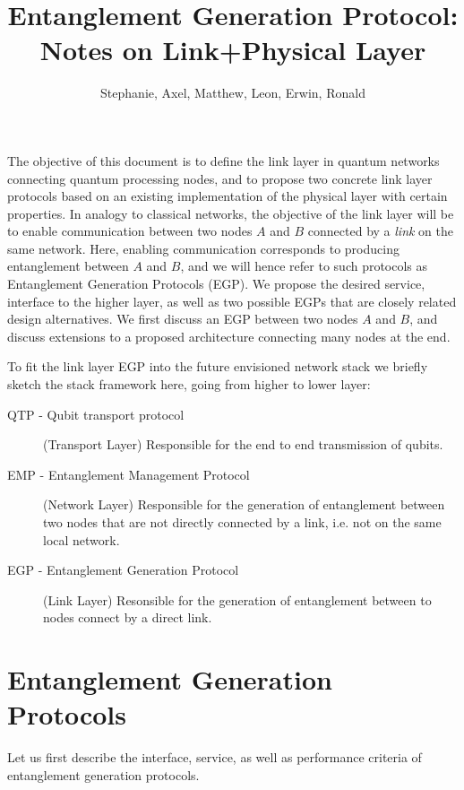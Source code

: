\documentclass{article}
\begin{document}
\title{Entanglement Generation Protocol: Notes on Link+Physical Layer}
\author{Stephanie, Axel, Matthew, Leon, Erwin, Ronald}
\maketitle

The objective of this document is to define the link layer in quantum networks connecting quantum processing nodes, and to propose two concrete link layer protocols
based on an existing implementation of the physical layer with certain properties. In analogy to classical networks, the objective of the link layer will be to enable communication between two nodes $A$ and $B$ connected by a \emph{link} on the same network. Here, enabling communication corresponds to producing entanglement between $A$ and $B$, and we will hence refer to such protocols as Entanglement Generation Protocols (EGP). 
We propose the desired service, interface to the higher layer, as well as two possible EGPs that are closely related design alternatives. We first discuss an EGP between two nodes $A$ and $B$, and discuss extensions
to a proposed architecture connecting many nodes at the end.

To fit the link layer EGP into the future envisioned network stack we briefly sketch the stack framework here, going from higher to lower layer:
\begin{description}
\item[QTP - Qubit transport protocol] (Transport Layer) Responsible for the end to end transmission of qubits. 
\item[EMP - Entanglement Management Protocol] (Network Layer) Responsible for the generation of entanglement between two nodes that are not directly connected by a link, i.e. not on the same local network.
\item[EGP - Entanglement Generation Protocol] (Link Layer) Resonsible for the generation of entanglement between to nodes connect by a direct link. 
\end{description}

\section{Entanglement Generation Protocols}
Let us first describe the interface, service, as well as performance criteria of entanglement generation protocols.
\end{document}
